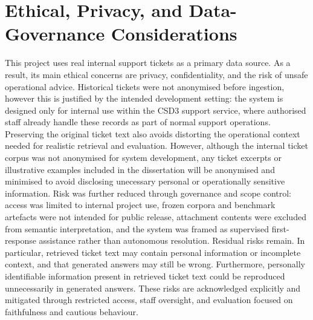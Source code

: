 \section{Ethical, Privacy, and Data-Governance Considerations}
\label{sec:ethics_privacy_governance}

This project uses real internal support tickets as a primary data source. As a result, its main ethical concerns are privacy, confidentiality, and the risk of unsafe operational advice. Historical tickets were not anonymised before ingestion, however this is justified by the intended development setting: the system is designed only for internal use within the CSD3 support service, where authorised staff already handle these records as part of normal support operations. Preserving the original ticket text also avoids distorting the operational context needed for realistic retrieval and evaluation. However, although the internal ticket corpus was not anonymised for system development, any ticket excerpts or illustrative examples included in the dissertation will be anonymised and minimised to avoid disclosing unecessary personal or operationally sensitive information. Risk was further reduced through governance and scope control: access was limited to internal project use, frozen corpora and benchmark artefacts were not intended for public release, attachment contents were excluded from semantic interpretation, and the system was framed as supervised first-response assistance rather than autonomous resolution. Residual risks remain. In particular, retrieved ticket text may contain personal information or incomplete context, and that generated answers may still be wrong. Furthermore, personally identifiable information present in retrieved ticket text could be reproduced unnecessarily in generated answers. These risks are acknowledged explicitly and mitigated through restricted access, staff oversight, and evaluation focused on faithfulness and cautious behaviour. 